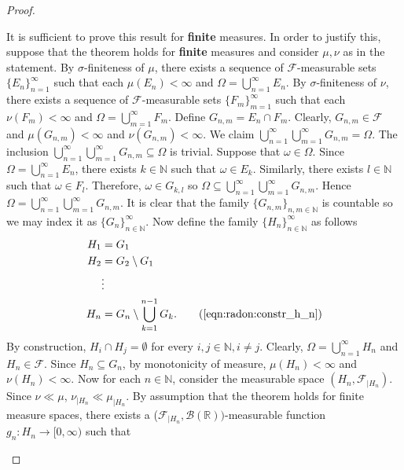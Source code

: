 \begin{proof}
\setcounter{step}{0}
\begin{step}
It is sufficient to prove this result for \textbf{finite} measures.
In order to justify this, suppose that the theorem holds for \textbf{finite} measures and consider $\mu, \nu$ as in the statement. By $\sigma$-finiteness of $\mu$, there exists a sequence of $\mathcal{F}$-measurable sets $\{ E_n \}_{n=1}^{\infty}$ such that each $\mu(E_n) < \infty$ and $\Omega = \bigcup_{n = 1}^{\infty} E_n$. By $\sigma$-finiteness of $\nu$, there exists a sequence of $\mathcal{F}$-measurable sets $\{ F_m \}_{m=1}^{\infty}$ such that each $\nu(F_m) < \infty$ and $\Omega = \bigcup_{m = 1}^{\infty} F_m$.
Define $G_{n,m} = E_n \cap F_m.$ Clearly, $G_{n, m} \in \mathcal{F}$ and $\mu(G_{n,m}) < \infty$ and $\nu(G_{n,m}) < \infty$. We claim $\bigcup_{n = 1} ^{\infty} \bigcup_{m=1} ^{\infty} G_{n,m} = \Omega$. The inclusion $\bigcup_{n = 1} ^{\infty} \bigcup_{m=1} ^{\infty} G_{n,m} \subseteq \Omega$ is trivial. Suppose that $\omega \in \Omega$. Since $\Omega = \bigcup_{n = 1}^{\infty} E_n$, there exists $k \in \mathbb{N}$ such that $\omega \in E_k$. Similarly, there exists $l \in \mathbb{N}$ such that $\omega \in F_l$. Therefore, $\omega \in G_{k, l}$ so $\Omega \subseteq \bigcup_{n = 1} ^{\infty} \bigcup_{m=1} ^{\infty} G_{n,m}$. Hence $\Omega = \bigcup_{n = 1} ^{\infty} \bigcup_{m=1} ^{\infty} G_{n,m}$. 
It is clear that the family $\{ G_{n, m} \}_{n, m \in \mathbb{N}}$ is countable so we may index it as $\{ G_n \}_{n \in \mathbb{N}}^{\infty}$. Now define the family $\{ H_n \}_{n \in \mathbb{N}}^{\infty}$ as follows
\begin{subequations}\label{eqn:radon:constr_h_n}
\begin{align*}
    H_{1} &= G_1 \\
    H_{2} &= G_2 \setminus G_1  \\
    & \vdots  \\
    H_{n} &= G_n \setminus \bigcup_{k = 1} ^ {n - 1} G_k .
     \tag{\ref{eqn:radon:constr_h_n}} 
\end{align*}
\end{subequations}
By construction, $H_{i} \cap H_{j} = \emptyset$ for every $i, j \in \mathbb{N}, i \neq j$. Clearly, $ \Omega = \bigcup_{n = 1} ^ {\infty} H_n$ and $H_n \in \mathcal{F}$. Since $H_n \subseteq G_n$, by monotonicity of measure, $\mu(H_n) < \infty$ and $\nu(H_n) < \infty$.
Now for each $n \in \mathbb{N}$, consider the measurable space $(H_n, \mathcal{F}_{| H_n})$. Since $\nu \ll \mu$, $\nu_{| H_n} \ll \mu_{| H_n}$. By assumption that the theorem holds for finite measure spaces, there exists a ($\mathcal{F}_{| H_n}, \mathcal{B}(\mathbb{R}))$-measurable function $g_n : H_n \to [0, \infty)$ such that

\end{step}
\end{proof}
